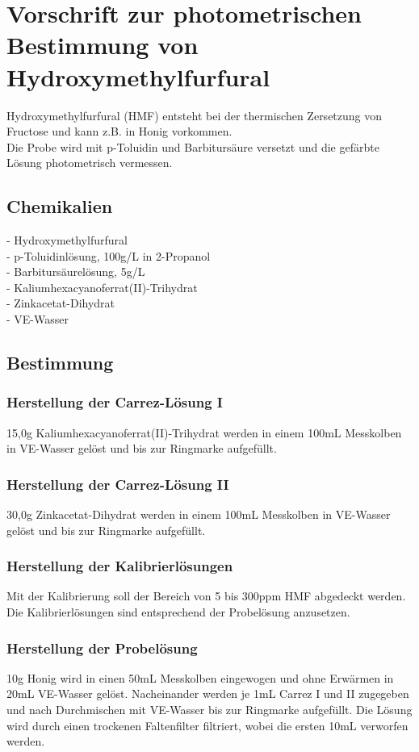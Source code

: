 \chapter{Vorschrift zur photometrischen Bestimmung von Hydroxymethylfurfural}

Hydroxymethylfurfural (HMF) entsteht bei der thermischen Zersetzung von Fructose und kann z.B. in Honig vorkommen.\\
Die Probe wird mit p-Toluidin und Barbitursäure versetzt und die gefärbte Lösung photometrisch vermessen.

\section{Chemikalien}
- Hydroxymethylfurfural\\
- p-Toluidinlösung, 100g/L in 2-Propanol\\
- Barbitursäurelösung, 5g/L\\
- Kaliumhexacyanoferrat(II)-Trihydrat\\
- Zinkacetat-Dihydrat\\
- VE-Wasser

\section{Bestimmung}
\subsection{Herstellung der Carrez-Lösung I}
15,0g Kaliumhexacyanoferrat(II)-Trihydrat werden in einem 100mL Messkolben in VE-Wasser gelöst und bis zur Ringmarke aufgefüllt.
\subsection{Herstellung der Carrez-Lösung II}
30,0g Zinkacetat-Dihydrat werden in einem 100mL Messkolben in VE-Wasser gelöst und bis zur Ringmarke aufgefüllt.
\subsection{Herstellung der Kalibrierlösungen}
Mit der Kalibrierung soll der Bereich von 5 bis 300ppm HMF abgedeckt werden. Die Kalibrierlösungen sind entsprechend der Probelösung anzusetzen.
\subsection{Herstellung der Probelösung}
10g Honig wird in einen 50mL Messkolben eingewogen und ohne Erwärmen in 20mL VE-Wasser gelöst. Nacheinander werden je 1mL Carrez I und II zugegeben und nach Durchmischen mit VE-Wasser bis zur Ringmarke aufgefüllt. Die Lösung wird durch einen trockenen Faltenfilter filtriert, wobei die ersten 10mL verworfen werden.
